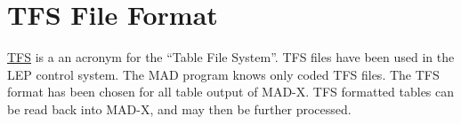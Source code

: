 
\chapter{TFS File Format}

\href{bibliography.html#tfs}{TFS} is a an acronym for the ``Table File
System''. TFS files have been used in the LEP control system. The MAD program
knows only coded TFS files. The TFS format has been chosen for all table
output of MAD-X. TFS formatted tables can be read back into MAD-X, and
may then be further processed.
 






